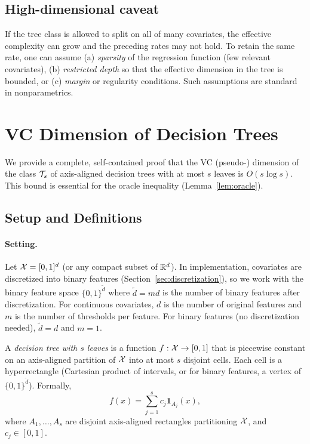 \documentclass[12pt]{article}
\begin{document}
\subsection{High-dimensional caveat}
If the tree class is allowed to split on all of many covariates, the effective complexity can grow and the preceding rates may not hold. To retain the same rate, one can assume (a) \emph{sparsity} of the regression function (few relevant covariates), (b) \emph{restricted depth} so that the effective dimension in the tree is bounded, or (c) \emph{margin} or regularity conditions. Such assumptions are standard in nonparametrics.

\section{VC Dimension of Decision Trees}
\label{app:vc-dimension}

We provide a complete, self-contained proof that the VC (pseudo-) dimension of the class $\mathcal{T}_s$ of axis-aligned decision trees with at most $s$ leaves is $O(s \log s)$. This bound is essential for the oracle inequality (Lemma~\ref{lem:oracle}).

\subsection{Setup and Definitions}

\paragraph{Setting.}
Let $\mathcal{X} = [0,1]^d$ (or any compact subset of $\mathbb{R}^d$). In implementation, covariates are discretized into binary features (Section~\ref{sec:discretization}), so we work with the binary feature space $\{0,1\}^{\tilde{d}}$ where $\tilde{d} = md$ is the number of binary features after discretization. For continuous covariates, $d$ is the number of original features and $m$ is the number of thresholds per feature. For binary features (no discretization needed), $\tilde{d} = d$ and $m = 1$.

A \emph{decision tree with $s$ leaves} is a function $f: \mathcal{X} \to [0,1]$ that is piecewise constant on an axis-aligned partition of $\mathcal{X}$ into at most $s$ disjoint cells. Each cell is a hyperrectangle (Cartesian product of intervals, or for binary features, a vertex of $\{0,1\}^{\tilde{d}}$). Formally,
\[
f(x) = \sum_{j=1}^s c_j \mathbf{1}_{A_j}(x),
\]
where $A_1, \ldots, A_s$ are disjoint axis-aligned rectangles partitioning $\mathcal{X}$, and $c_j \in [0,1]$.
\end{document}
